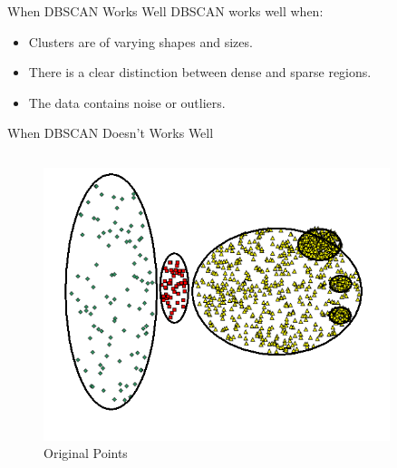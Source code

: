 \begin{frame}[allowframebreaks]{When DBSCAN Works Well}
DBSCAN works well when:
\begin{itemize}
        \item Clusters are of varying shapes and sizes.
        \item There is a clear distinction between dense and sparse regions.
        \item The data contains noise or outliers.
\end{itemize}
\end{frame}

\begin{frame}[allowframebreaks]{When DBSCAN Doesn't Works Well}
\begin{columns}
    \begin{column}{0.5\textwidth}
       \begin{figure}
            \centering
            \includegraphics[width=0.9\textwidth,keepaspectratio]{images/dul/dbscan/dbscan-original-pts-2.png}
            \caption{Original Points}
        \end{figure}


\end{column}
\end{columns}
\end{frame}
